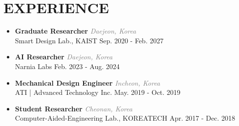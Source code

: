 \documentclass[a4paper,10pt]{article}
\begin{document}
\section*{EXPERIENCE}
\begin{itemize}[left=0pt]
\item \textbf{Graduate Researcher}                                              \hfill \textit{\textcolor{gray}{Daejeon, Korea}} \\
    Smart Design Lab., KAIST                                                    \hfill Sep. 2020 - Feb. 2027
\item \textbf{AI Researcher}                                                    \hfill \textit{\textcolor{gray}{Daejeon, Korea}} \\
    Narnia Labs                                                                 \hfill Feb. 2023 - Aug. 2024
\item \textbf{Mechanical Design Engineer}                                       \hfill \textit{\textcolor{gray}{Incheon, Korea}} \\
    ATI | Advanced Technology Inc.                                              \hfill May. 2019 - Oct. 2019
\item \textbf{Student Researcher}                                               \hfill \textit{\textcolor{gray}{Cheonan, Korea}} \\
    Computer-Aided-Engineering Lab., KOREATECH                                  \hfill Apr. 2017 - Dec. 2018
\end{itemize}
\end{document}

